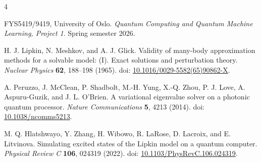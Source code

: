 \documentclass[10pt,a4paper]{article}
\begin{document}
\begin{thebibliography}{4}

FYS5419/9419, University of Oslo. \emph{Quantum Computing and Quantum Machine Learning, Project 1}. Spring semester 2026.

H. J. Lipkin, N. Meshkov, and A. J. Glick. Validity of many-body approximation methods for a solvable model: (I). Exact solutions and perturbation theory. \emph{Nuclear Physics} \textbf{62}, 188--198 (1965). doi: \href{https://doi.org/10.1016/0029-5582(65)90862-X}{10.1016/0029-5582(65)90862-X}.

A. Peruzzo, J. McClean, P. Shadbolt, M.-H. Yung, X.-Q. Zhou, P. J. Love, A. Aspuru-Guzik, and J. L. O'Brien. A variational eigenvalue solver on a photonic quantum processor. \emph{Nature Communications} \textbf{5}, 4213 (2014). doi: \href{https://doi.org/10.1038/ncomms5213}{10.1038/ncomms5213}.

M. Q. Hlatshwayo, Y. Zhang, H. Wibowo, R. LaRose, D. Lacroix, and E. Litvinova. Simulating excited states of the Lipkin model on a quantum computer. \emph{Physical Review C} \textbf{106}, 024319 (2022). doi: \href{https://doi.org/10.1103/PhysRevC.106.024319}{10.1103/PhysRevC.106.024319}.

\end{thebibliography}
\end{document}
